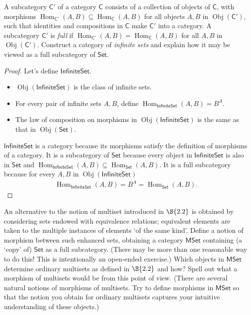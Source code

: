 \begin{exercise}{3.8}
	A subcategory $\mathsf{C}'$ of a category $\mathsf{C}$ consists of a collection of objects of $\mathsf{C}$, with morphisms $\operatorname{Hom}_{\mathsf{C}'}(A, B) \subseteq \operatorname{Hom}_{\mathsf{C}}(A, B)$ for all objects $A, B$ in $\operatorname{Obj}(\mathsf{C}')$, such that identities and compositions in $\mathsf{C}$ make $\mathsf{C}'$ into a category. A subcategory $\mathsf{C}'$ is \textit{full} if $\operatorname{Hom}_{\mathsf{C}'}(A, B) = \operatorname{Hom}_{\mathsf{C}}(A, B)$ for all $A, B$ in $\operatorname{Obj}(\mathsf{C}')$. Construct a category of \textit{infinite sets} and explain how it may be viewed as a full subcategory of $\mathsf{Set}$.
\end{exercise}

\begin{proof}
	Let's define $\mathsf{InfiniteSet}$.
	\begin{itemize}
		\item $\operatorname{Obj}(\mathsf{InfiniteSet})$ is the class of infinite sets.
		\item For every pair of infinite sets $A, B$, define $\operatorname{Hom}_{\mathsf{InfiniteSet}}(A, B) = B^{A}$.
		\item The law of composition on morphisms in $\operatorname{Obj}(\mathsf{InfiniteSet})$ is the same as that in $\operatorname{Obj}(\mathsf{Set})$.
	\end{itemize}

	$\mathsf{InfiniteSet}$ is a category because its morphisms satisfy the definition of morphisms of a category. It is a subcategory of $\mathsf{Set}$ because every object in $\mathsf{InfiniteSet}$ is also in $\mathsf{Set}$ and $\operatorname{Hom}_{\mathsf{InfiniteSet}}(A, B)\subseteq \operatorname{Hom}_{\mathsf{Set}}(A, B)$. It is a full subcategory because for every $A, B$ in $\operatorname{Obj}(\mathsf{InfiniteSet})$
	\begin{align*}
		\operatorname{Hom}_{\mathsf{InfiniteSet}}(A, B) = B^{A} = \operatorname{Hom}_{\mathsf{Set}}(A, B).
	\end{align*}
\end{proof}

\begin{exercise}{3.9}
	An alternative to the notion of multiset introduced in $\S{2.2}$ is obtained by considering sets endowed with equivalence relations; equivalent elements are taken to the multiple instances of elements `of the same kind'. Define a notion of morphism between such enhanced sets, obtaining a category $\mathsf{MSet}$ containing (a `copy' of) $\mathsf{Set}$ as a full subcategory. (There may be more than one reasonable way to do this! This is intentionally an open-ended exercise.) Which objects in $\mathsf{MSet}$ determine ordinary multisets as defined in $\S{2.2}$ and how? Spell out what a morphism of multisets would be from this point of view. (There are several natural notions of morphisms of multisets. Try to define morphisms in $\mathsf{MSet}$ so that the notion you obtain for ordinary multisets captures your intuitive understanding of these objects.)
\end{exercise}

